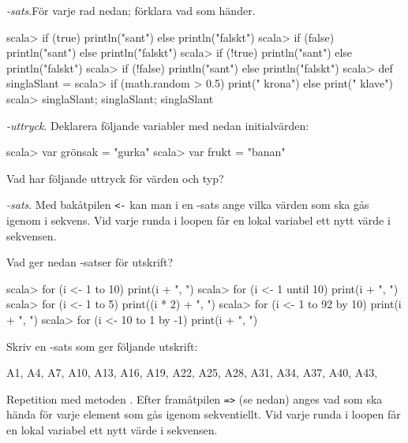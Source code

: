 {{\Task {}\textit{-sats}.För varje rad nedan; förklara vad som händer.  %
\begin{REPL}
scala> if (true) println("sant") else println("falskt")
scala> if (false) println("sant") else println("falskt")
scala> if (!true) println("sant") else println("falskt")
scala> if (!false) println("sant") else println("falskt")
scala> def singlaSlant =
scala> 	 if (math.random > 0.5) print(" krona") else print(" klave")
scala> singlaSlant; singlaSlant; singlaSlant
\end{REPL}


\Task {}\textit{-uttryck}. Deklarera följande variabler med nedan initialvärden:  %

\begin{REPLnonum}
scala> var grönsak = "gurka"
scala> var frukt = "banan"
\end{REPLnonum}

Vad har följande uttryck för värden och typ?

\Subtask {}

\Subtask {}

\Subtask {}

\Subtask {}

\Subtask {}


\Task {}\textit{-sats}.  Med bakåtpilen \texttt{<-} kan man i en -sats ange vilka värden som ska gås igenom i sekvens. Vid varje runda i loopen får en lokal variabel ett nytt värde i sekvensen. %

\Subtask Vad ger nedan -satser för utskrift?

\begin{REPL}
scala> for (i <- 1 to 10) print(i + ", ")
scala> for (i <- 1 until 10) print(i + ", ")
scala> for (i <- 1 to 5) print((i * 2) + ", ")
scala> for (i <- 1 to 92 by 10) print(i + ", ")
scala> for (i <- 10 to 1 by -1) print(i + ", ")
\end{REPL}

\Subtask Skriv en -sats som ger följande utskrift:
\begin{REPLnonum}
A1, A4, A7, A10, A13, A16, A19, A22, A25, A28, A31, A34, A37, A40, A43,
\end{REPLnonum}

\Task Repetition med metoden . Efter framåtpilen \texttt{=>} (se nedan) anges vad som ska hända för varje element som gås igenom sekventiellt. Vid varje runda i loopen får en lokal variabel ett nytt värde i sekvensen.   %

}}

